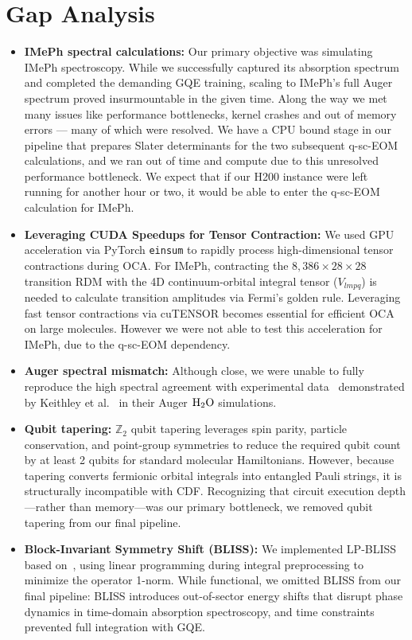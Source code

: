 \documentclass[11pt]{article}
\begin{document}
\section{Gap Analysis}
\begin{itemize}[leftmargin=*,noitemsep,topsep=0pt]
  \item \textbf{IMePh spectral calculations:} Our primary objective was simulating IMePh spectroscopy. While we successfully captured its absorption spectrum and completed the demanding GQE training, scaling to IMePh's full Auger spectrum proved insurmountable in the given time. Along the way we met many issues like performance bottlenecks, kernel crashes and out of memory errors — many of which were resolved. We have a CPU bound stage in our pipeline that prepares Slater determinants for the two subsequent q-sc-EOM calculations, and we ran out of time and compute due to this unresolved performance bottleneck. We expect that if our H200 instance were left running for another hour or two, it would be able to enter the q-sc-EOM calculation for IMePh.
  \item \textbf{Leveraging CUDA Speedups for Tensor Contraction:} We used GPU acceleration via PyTorch \texttt{einsum}  to rapidly process high-dimensional tensor contractions during OCA. For IMePh, contracting the $8{,}386 \times 28 \times 28$ transition RDM with the 4D continuum-orbital integral tensor ($V_{lmpq}$) is needed to calculate transition amplitudes via Fermi's golden rule. Leveraging fast tensor contractions via cuTENSOR becomes essential for efficient OCA on large molecules. However we were not able to test this acceleration for IMePh, due to the q-sc-EOM dependency.
  \item \textbf{Auger spectral mismatch:} Although close, we were unable to fully reproduce the high spectral agreement with experimental data~\cite{moddeman1973} demonstrated by Keithley et al.~\cite{keithley2026} in their Auger $\rm{H_2O}$ simulations.
  \item \textbf{Qubit tapering:} $\mathbb{Z}_2$ qubit tapering leverages spin parity, particle conservation, and point-group symmetries to reduce the required qubit count by at least 2 qubits for standard molecular Hamiltonians. However, because tapering converts fermionic orbital integrals into entangled Pauli strings, it is structurally incompatible with CDF. Recognizing that circuit execution depth—rather than memory—was our primary bottleneck, we removed qubit tapering from our final pipeline.
  \item \textbf{Block-Invariant Symmetry Shift (BLISS):} We implemented LP-BLISS based on~\cite{lp_bliss}, using linear programming during integral preprocessing to minimize the operator 1-norm. While functional, we omitted BLISS from our final pipeline: BLISS introduces out-of-sector energy shifts that disrupt phase dynamics in time-domain absorption spectroscopy, and time constraints prevented full integration with GQE.

\end{itemize}
\end{document}
